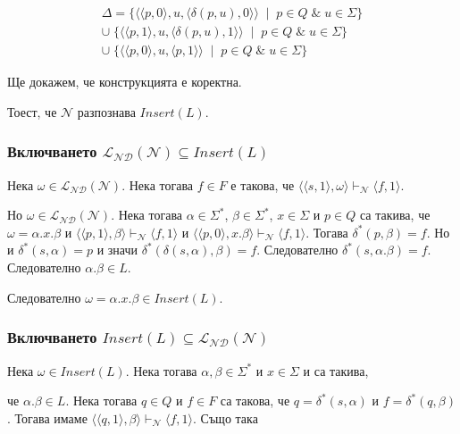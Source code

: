 \documentclass[12pt]{article}
\begin{document}
\begin{align*}
    \Delta = \{ \langle \langle p, 0 \rangle, u, \langle \delta(p, u), 0 \rangle \rangle \;\mid\; p \in Q \;\&\; u \in \Sigma \} \\
    \cup \; \{ \langle \langle p, 1 \rangle, u, \langle \delta(p, u), 1 \rangle \rangle \;\mid\; p \in Q \;\&\; u \in \Sigma \} \\
    \cup \; \{ \langle \langle p, 0 \rangle, u, \langle p, 1 \rangle \rangle \;\mid\; p \in Q \;\&\; u \in \Sigma \}
\end{align*}

Ще докажем, че конструкцията е коректна.

Тоест, че \(\mathcal N\) разпознава \(Insert(L)\).

\subsubsection*{Включването \(\mathcal{L_{ND}}(\mathcal{N}) \subseteq Insert(L)\)}
Нека \(\omega \in \mathcal{L_{ND}}(\mathcal{N})\). Нека тогава \(f \in F\) е такова, че \(\langle \langle s, 1 \rangle, \omega \rangle \vdash_\mathcal{N} \langle f, 1 \rangle \).

Но \(\omega \in \mathcal{L_{ND}}(\mathcal{N})\). Нека тогава \(\alpha \in \Sigma^*\), \(\beta \in \Sigma^*\), \(x \in \Sigma\) и \(p \in Q\) са такива, че \(\omega = \alpha.x.\beta\) и \(\langle \langle p, 1 \rangle, \beta \rangle \vdash_\mathcal{N} \langle f, 1 \rangle \) и \(\langle \langle p, 0 \rangle, x.\beta \rangle \vdash_\mathcal{N} \langle f, 1 \rangle \). Тогава \(\delta^*(p, \beta) = f\). Но и \(\delta^*(s, \alpha) = p\) и значи \(\delta^*(\delta(s, \alpha), \beta) = f\). Следователно \(\delta^*(s, \alpha.\beta) = f\). Следователно \(\alpha.\beta \in L\).

Следователно \(\omega = \alpha.x.\beta \in Insert(L)\).

\subsubsection*{Включването \(Insert(L) \subseteq \mathcal{L_{ND}}(\mathcal{N})\)}
Нека \(\omega \in Insert(L)\). Нека тогава \(\alpha, \beta \in \Sigma^*\) и \(x \in \Sigma\) и са такива,

че \(\alpha.\beta \in L\).
Нека тогава \(q \in Q\) и \(f \in F\) са такова, че \(q = \delta^*(s, \alpha) \) и \( f = \delta^*(q, \beta)\).
Тогава имаме \(\langle \langle q, 1 \rangle, \beta \rangle \vdash_\mathcal{N} \langle f, 1 \rangle \). Също така
\end{document}
